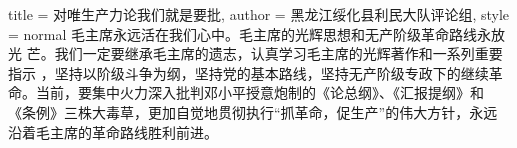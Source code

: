 \begin{hongqiarticle}{
        title  = {对唯生产力论我们就是要批},
        author = {黑龙江绥化县利民大队评论组},
        style  = normal
    }
    毛主席永远活在我们心中。毛主席的光辉思想和无产阶级革命路线永放光
    芒。我们一定要继承毛主席的遗志，认真学习毛主席的光辉著作和一系列重要指示
    ，坚持以阶级斗争为纲，坚持党的基本路线，坚持无产阶级专政下的继续革
    命。当前，要集中火力深入批判邓小平授意炮制的《论总纲》、《汇报提纲》和
    《条例》三株大毒草，更加自觉地贯彻执行“抓革命，促生产”的伟大方针，永远
    沿着毛主席的革命路线胜利前进。
\end{hongqiarticle}